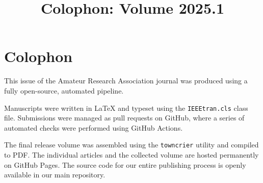 \documentclass[conference, compsoc, draft]{IEEEtran}
\title{Colophon: Volume 2025.1}
\author{
    \IEEEauthorblockN{The ARA Founding Committee}
    \IEEEauthorblockA{
        contact@ara.pub \\
        https://ara.pub
    }
}
\begin{document}
\IEEEoverridecommandlockouts
{}

\maketitle

\IEEEpubidadjcol

\section*{Colophon}

This issue of the Amateur Research Association journal was produced using a fully open-source, automated pipeline.

Manuscripts were written in LaTeX and typeset using the \texttt{IEEEtran.cls} class file. Submissions were managed as pull requests on GitHub, where a series of automated checks were performed using GitHub Actions.

The final release volume was assembled using the \texttt{towncrier} utility and compiled to PDF. The individual articles and the collected volume are hosted permanently on GitHub Pages. The source code for our entire publishing process is openly available in our main repository.
\end{document}
